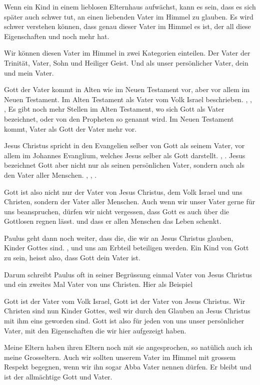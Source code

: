 \begin{otsblock}[Einführung]
    Wenn ein Kind in einem lieblosen Elternhaus aufwächst, kann es sein, dass es sich später auch schwer tut, an einen liebenden Vater im Himmel zu glauben. Es wird schwer verstehen können, dass genau dieser Vater im Himmel es ist, der all diese Eigenschaften und noch mehr hat.

    Wir können diesen Vater im Himmel in zwei Kategorien einteilen. Der Vater der Trinität, Vater, Sohn und Heiliger Geist. Und als unser persönlicher Vater, dein und mein Vater.
\end{otsblock}
\begin{otsblock}
Gott der Vater kommt in Alten wie im Neuen Testament vor, aber vor allem im Neuen Testament. Im Alten Testament als Vater vom Volk Israel beschrieben.
, , , 
Es gibt noch mehr Stellen im Alten Testament, wo sich Gott als Vater bezeichnet, oder von den Propheten so genannt wird. Im Neuen Testament kommt, Vater als Gott der Vater mehr vor.

Jesus Christus spricht in den Evangelien selber von Gott als seinem Vater, vor allem im Johannes Evanglium, welches Jesus selber als Gott darstellt. , . 
Jesus bezeichnet Gott aber nicht nur als seinen persönlichen Vater, sondern auch als den Vater aller Menschen. , , .

Gott ist also nicht nur der Vater von Jesus Christus, dem Volk Israel und uns Christen, sondern der Vater aller Menschen. Auch wenn wir unser Vater gerne für uns beanspruchen, dürfen wir nicht vergessen, dass Gott es auch über die Gottlosen regnen lässt.  und dass er allen Menschen das Leben schenkt. 

Paulus geht dann noch weiter, dass die, die wir an Jesus Christus glauben, Kinder Gottes sind. ,  und uns am Erbteil beteiligen werden. Ein Kind von Gott zu sein, heisst also, dass Gott dein Vater ist.

Darum schreibt Paulus oft in seiner Begrüssung einmal Vater von Jesus Christus und ein zweites Mal Vater von uns Christen. Hier als Beispiel  

\end{otsblock}
\begin{otsblock}[Schlussfolgerung]
 Gott ist der Vater vom Volk Israel, Gott ist der Vater von Jesus Christus. Wir Christen sind nun Kinder Gottes, weil wir durch den Glauben an Jesus Christus mit ihm eins geworden sind. Gott ist also für jeden von uns unser persönlicher Vater, mit den Eigenschaften die wir hier aufgezeigt haben.

 Meine Eltern haben ihren Eltern noch mit sie angesprochen, so natülich auch ich meine Grosseltern. Auch wir sollten unserem Vater im Himmel mit grossem Respekt begegnen, wenn wir ihn sogar Abba Vater nennen dürfen. Er bleibt und ist der allmächtige Gott und Vater.


\end{otsblock}